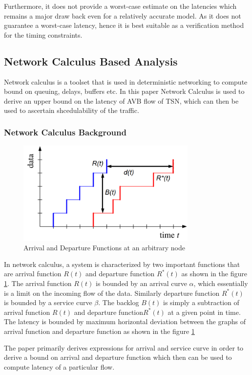\documentclass[journal,12pt,twocolumn]{IEEEtran}
\begin{document}
Furthermore, it does not provide a worst-case estimate on the latencies which remains a major draw back even for a relatively accurate model. As it does not guarantee a worst-case latency, hence it is best suitable as a verification method for the timing constraints.

\subsection {Network Calculus Based Analysis}
Network calculus is a toolset that is used in deterministic networking to compute bound on queuing, delays, buffers etc. In this paper \cite{NC} Network Calculus is used to derive an upper bound on the latency of AVB flow of TSN, which can then be used to ascertain shcedulability of the traffic.
\subsubsection {Network Calculus Background}
\begin{figure}
\centering
\includegraphics[width=3.5in]{NC_Background}
\caption{Arrival and Departure Functions at an arbitrary node}
\label{NC_Background}
\end{figure}
In network calculus, a system is characterized by two important functions that are arrival function $R(t)$ and departure function $R^*(t)$ as shown in the figure \ref{NC_Background}. The arrival function $R(t)$ is bounded by an arrival curve $\alpha$, which essentially is a limit on the incoming flow of the data. Similarly departure function $R^*(t)$ is bounded by a service curve $\beta$. The backlog $B(t)$ is simply a subtraction of arrival function $R(t)$ and departure function$ R^*(t)$  at a given point in time. The latency is bounded by maximum horizontal deviation between the graphs of arrival function and departure function as shown in the figure \ref{NC_Background}

The paper primarily derives expressions for arrival and service curve in order to derive a bound on arrival and departure function which then can be used to compute latency of a particular 
flow.
\end{document}
